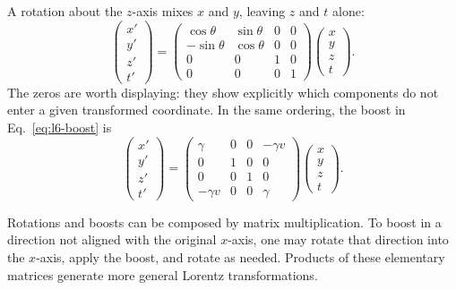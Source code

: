 A rotation about the \(z\)-axis mixes \(x\) and \(y\), leaving \(z\) and
\(t\) alone:
\begin{equation}
\begin{pmatrix}
  x'\\ y'\\ z'\\ t'
\end{pmatrix}
=
\begin{pmatrix}
  \cos\theta & \sin\theta & 0 & 0\\
  -\sin\theta & \cos\theta & 0 & 0\\
  0 & 0 & 1 & 0\\
  0 & 0 & 0 & 1
\end{pmatrix}
\begin{pmatrix}
  x\\ y\\ z\\ t
\end{pmatrix}.
\end{equation}
The zeros are worth displaying: they show explicitly which components do not
enter a given transformed coordinate. In the same ordering, the boost in
Eq.~\eqref{eq:l6-boost} is
\begin{equation}
\begin{pmatrix}
  x'\\ y'\\ z'\\ t'
\end{pmatrix}
=
\begin{pmatrix}
  \gamma & 0 & 0 & -\gamma v\\
  0 & 1 & 0 & 0\\
  0 & 0 & 1 & 0\\
  -\gamma v & 0 & 0 & \gamma
\end{pmatrix}
\begin{pmatrix}
  x\\ y\\ z\\ t
\end{pmatrix}.
\end{equation}

Rotations and boosts can be composed by matrix multiplication. To boost in a
direction not aligned with the original \(x\)-axis, one may rotate that
direction into the \(x\)-axis, apply the boost, and rotate as needed. Products
of these elementary matrices generate more general Lorentz transformations.

\begin{classroomqa}
\end{classroomqa}

